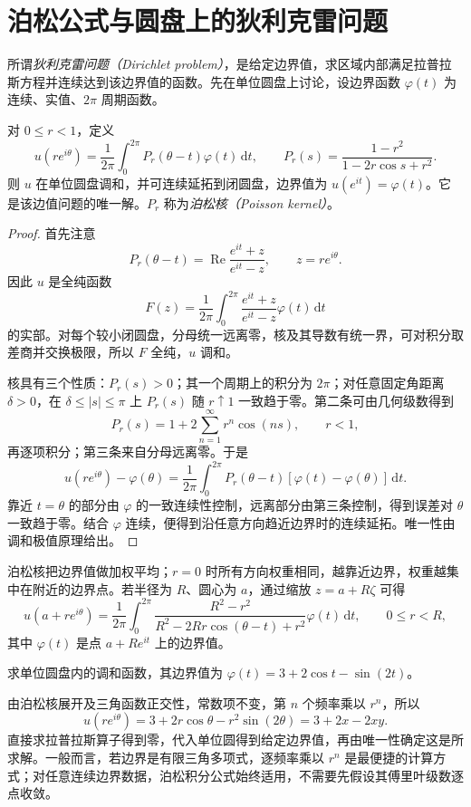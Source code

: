 \section{泊松公式与圆盘上的狄利克雷问题}

所谓\emph{狄利克雷问题（Dirichlet problem）}，是给定边界值，求区域内部满足拉普拉斯方程并连续达到该边界值的函数。先在单位圆盘上讨论，设边界函数 $\varphi(t)$ 为连续、实值、$2\pi$ 周期函数。

\begin{theorem}[圆盘上的泊松公式]
\label{thm:ca-poisson}
对 $0\le r<1$，定义
\begin{equation}
 u(re^{i\theta})=\frac1{2\pi}\int_0^{2\pi}
 P_r(\theta-t)\varphi(t)\,\mathrm dt,
 \qquad
 P_r(s)=\frac{1-r^2}{1-2r\cos s+r^2}.
 \label{eq:ca-poisson}
\end{equation}
则 $u$ 在单位圆盘调和，并可连续延拓到闭圆盘，边界值为 $u(e^{it})=\varphi(t)$。它是该边值问题的唯一解。$P_r$ 称为\emph{泊松核（Poisson kernel）}。
\end{theorem}
\begin{proof}
首先注意
\[
 P_r(\theta-t)=\operatorname{Re}\frac{e^{it}+z}{e^{it}-z},\qquad z=re^{i\theta}.
\]
因此 $u$ 是全纯函数
\[
 F(z)=\frac1{2\pi}\int_0^{2\pi}\frac{e^{it}+z}{e^{it}-z}\varphi(t)\,\mathrm dt
\]
的实部。对每个较小闭圆盘，分母统一远离零，核及其导数有统一界，可对积分取差商并交换极限，所以 $F$ 全纯，$u$ 调和。

核具有三个性质：$P_r(s)>0$；其一个周期上的积分为 $2\pi$；对任意固定角距离 $\delta>0$，在 $\delta\le|s|\le\pi$ 上 $P_r(s)$ 随 $r\uparrow1$ 一致趋于零。第二条可由几何级数得到
\[
 P_r(s)=1+2\sum_{n=1}^\infty r^n\cos(ns),\qquad r<1,
\]
再逐项积分；第三条来自分母远离零。于是
\[
 u(re^{i\theta})-\varphi(\theta)
 =\frac1{2\pi}\int_0^{2\pi}P_r(\theta-t)
 [\varphi(t)-\varphi(\theta)]\,\mathrm dt.
\]
靠近 $t=\theta$ 的部分由 $\varphi$ 的一致连续性控制，远离部分由第三条控制，得到误差对 $\theta$ 一致趋于零。结合 $\varphi$ 连续，便得到沿任意方向趋近边界时的连续延拓。唯一性由调和极值原理给出。
\end{proof}

泊松核把边界值做加权平均；$r=0$ 时所有方向权重相同，越靠近边界，权重越集中在附近的边界点。若半径为 $R$、圆心为 $a$，通过缩放 $z=a+R\zeta$ 可得
\[
 u(a+re^{i\theta})=\frac1{2\pi}\int_0^{2\pi}
 \frac{R^2-r^2}{R^2-2Rr\cos(\theta-t)+r^2}
 \varphi(t)\,\mathrm dt,\qquad 0\le r<R,
\]
其中 $\varphi(t)$ 是点 $a+Re^{it}$ 上的边界值。

\begin{example}[由边界的三角多项式求内部解]
求单位圆盘内的调和函数，其边界值为 $\varphi(t)=3+2\cos t-\sin(2t)$。
\end{example}
\begin{solve}
由泊松核展开及三角函数正交性，常数项不变，第 $n$ 个频率乘以 $r^n$，所以
\[
 u(re^{i\theta})=3+2r\cos\theta-r^2\sin(2\theta)
 =3+2x-2xy.
\]
直接求拉普拉斯算子得到零，代入单位圆得到给定边界值，再由唯一性确定这是所求解。一般而言，若边界是有限三角多项式，逐频率乘以 $r^n$ 是最便捷的计算方式；对任意连续边界数据，泊松积分公式始终适用，不需要先假设其傅里叶级数逐点收敛。
\end{solve}

